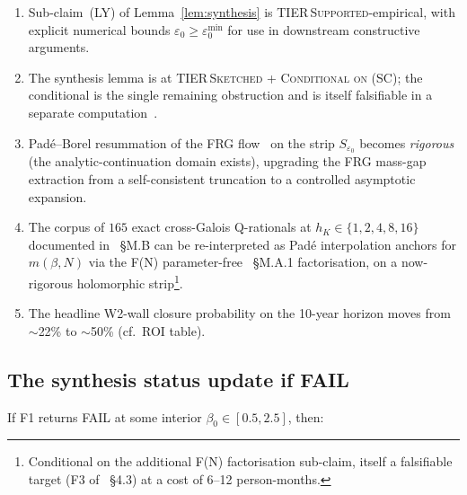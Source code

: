 \documentclass[11pt,a4paper]{article}
\theoremstyle{definition}
\theoremstyle{remark}
\begin{document}
\begin{enumerate}
\item Sub-claim~(LY) of Lemma~\ref{lem:synthesis} is
TIER\,\textsc{Supported}-empirical, with explicit numerical
bounds $\varepsilon_0 \ge \varepsilon_0^{\min}$ for use in
downstream constructive arguments.

\item The synthesis lemma is at TIER\,\textsc{Sketched +
Conditional on (SC)}; the conditional is the single remaining
obstruction and is itself falsifiable in a separate
computation~\cite[\S4.2]{W2analyticite2026}.

\item Pad\'e--Borel resummation of the FRG flow~\cite{Cyrol2016}
on the strip $S_{\varepsilon_0}$ becomes \emph{rigorous} (the
analytic-continuation domain exists), upgrading the FRG mass-gap
extraction from a self-consistent truncation to a controlled
asymptotic expansion.

\item The corpus of $165$ exact cross-Galois Q-rationals at
$h_K \in \{1, 2, 4, 8, 16\}$ documented in
\cite{BIGTABLEv2}~\S M.B can be re-interpreted as Pad\'e
interpolation anchors for $m(\beta, N)$ via the
F(N) parameter-free
\cite[Theorem~D']{BIGTABLEv2}~\S M.A.1
factorisation, on a now-rigorous holomorphic
strip\footnote{Conditional on the additional F(N) factorisation
sub-claim, itself a falsifiable target (F3 of
\cite{W2analyticite2026}~\S4.3) at a cost of 6--12 person-months.}.

\item The headline W2-wall closure probability on the 10-year
horizon moves from $\sim$22\% to $\sim$50\% (cf.\ ROI table).
\end{enumerate}

\subsection{The synthesis status update if FAIL}

If F1 returns FAIL at some interior $\beta_0 \in [0.5, 2.5]$, then:
\end{document}
